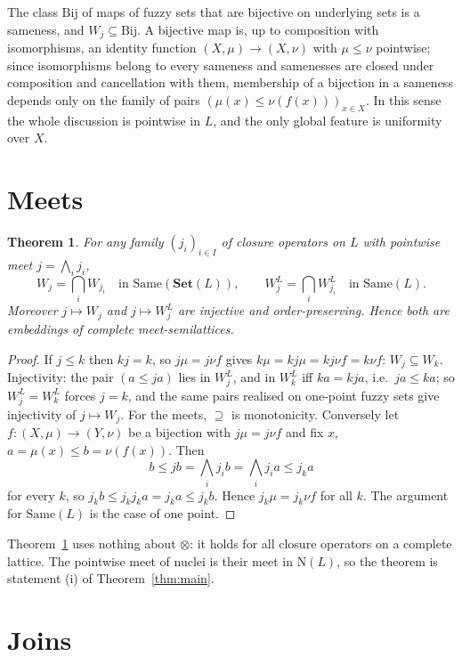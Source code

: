 \documentclass[11pt]{amsart}
\newtheorem{thm}{Theorem}[section]
\theoremstyle{definition}
\newcommand{\Nuc}{\mathrm{N}}
\newcommand{\Same}{\mathrm{Same}}
\newcommand{\FSet}{\mathbf{Set}}
\newcommand{\Bij}{\mathrm{Bij}}
\begin{document}
The class $\Bij$ of maps of fuzzy sets that are bijective on underlying
sets is a sameness, and $W_j\subseteq\Bij$. A bijective map is, up to
composition with isomorphisms, an identity function $(X,\mu)\to(X,\nu)$
with $\mu\le\nu$ pointwise; since isomorphisms belong to every sameness and
samenesses are closed under composition and cancellation with them,
membership of a bijection in a sameness depends only on the family of
pairs $(\mu(x)\le\nu(f(x)))_{x\in X}$. In this sense the whole discussion is
pointwise in $L$, and the only global feature is uniformity over $X$.

\section{Meets}\label{sec:meets}

\begin{thm}\label{thm:meets}
For any family $(j_i)_{i\in I}$ of closure operators on $L$ with pointwise
meet $j=\bigwedge_ij_i$,
\[
W_j=\bigcap_iW_{j_i}\quad\text{in }\Same(\FSet(L)),\qquad
W^L_j=\bigcap_iW^L_{j_i}\quad\text{in }\Same(L).
\]
Moreover $j\mapsto W_j$ and $j\mapsto W^L_j$ are injective and order-preserving.
Hence both are embeddings of complete meet-semilattices.
\end{thm}
\begin{proof}
If $j\le k$ then $kj=k$, so $j\mu=j\nu f$ gives $k\mu=kj\mu=kj\nu f=k\nu f$:
$W_j\subseteq W_k$. Injectivity: the pair $(a\le ja)$ lies in $W^L_j$, and in
$W^L_k$ iff $ka=kja$, i.e.\ $ja\le ka$; so $W^L_j=W^L_k$ forces $j=k$, and
the same pairs realised on one-point fuzzy sets give injectivity of
$j\mapsto W_j$. For the meets, $\supseteq$ is monotonicity. Conversely let
$f\colon(X,\mu)\to(Y,\nu)$ be a bijection with $j\mu=j\nu f$ and fix $x$,
$a=\mu(x)\le b=\nu(f(x))$. Then
\[
b\le jb=\textstyle\bigwedge_ij_ib=\bigwedge_ij_ia\le j_ka
\]
for every $k$, so $j_kb\le j_kj_ka=j_ka\le j_kb$. Hence $j_k\mu=j_k\nu f$
for all $k$. The argument for $\Same(L)$ is the case of one point.
\end{proof}

Theorem~\ref{thm:meets} uses nothing about $\otimes$: it holds for all
closure operators on a complete lattice. The pointwise meet of nuclei is
their meet in $\Nuc(L)$, so the theorem is statement (i) of
Theorem~\ref{thm:main}.

\section{Joins}\label{sec:joins}
\end{document}
